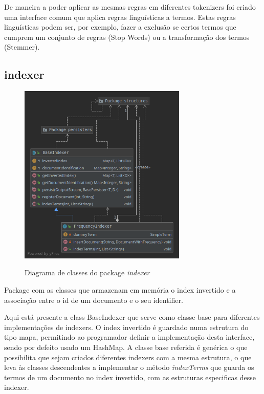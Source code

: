 \documentclass[12pt]{article}
\begin{document}
De maneira a poder aplicar as mesmas regras em diferentes tokenizers
foi criado uma interface comum que aplica regras linguísticas a termos.
Estas regras linguísticas podem ser, por exemplo, fazer a exclusão se certos termos
que cumprem um conjunto de regras (Stop Words) ou a transformação dos termos (Stemmer).

\subsection{indexer}
\begin{figure}[H]
  \center
  \includegraphics[width=8cm]{packages_indexer.png}
  \label{fig:packages_indexer}
  \caption{Diagrama de classes do package \it indexer}
\end{figure}

Package com as classes que armazenam em memória o index invertido e
a associação entre o id de um documento e o seu identifier.

Aqui está presente a class BaseIndexer que serve como classe base para
diferentes implementações de indexers. O index invertido é guardado numa
estrutura do tipo mapa, permitindo ao programador definir a implementação
desta interface, sendo por defeito usado um HashMap. A classe base referida
é genérica o que possibilita que sejam criados diferentes indexers com a
mesma estrutura, o que leva às classes descendentes a implementar o método
{\it indexTerms} que guarda os termos de um documento no index invertido,
com as estruturas especificas desse indexer.
\end{document}
